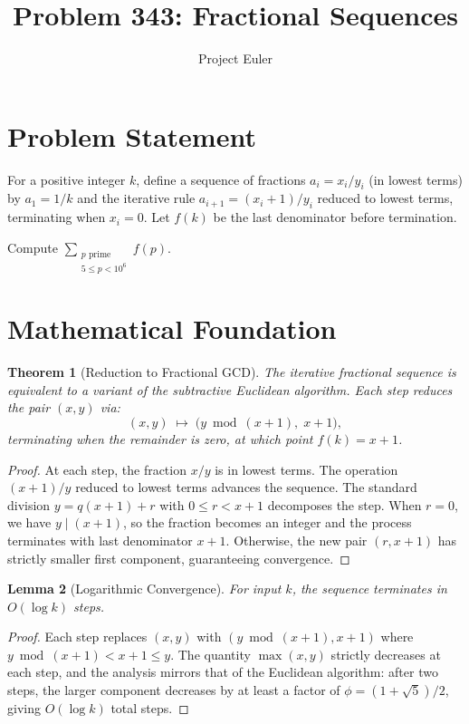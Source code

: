 \documentclass[a4paper,12pt]{article}
\title{Problem 343: Fractional Sequences}
\author{Project Euler}
\date{}
\newtheorem{theorem}{Theorem}
\newtheorem{lemma}[theorem]{Lemma}
\begin{document}
\maketitle

\section{Problem Statement}
For a positive integer $k$, define a sequence of fractions $a_i = x_i/y_i$ (in lowest terms) by $a_1 = 1/k$ and the iterative rule $a_{i+1} = (x_i + 1)/y_i$ reduced to lowest terms, terminating when $x_i = 0$. Let $f(k)$ be the last denominator before termination.

Compute $\displaystyle\sum_{\substack{p \text{ prime} \\ 5 \le p < 10^6}} f(p)$.

\section{Mathematical Foundation}

\begin{theorem}[Reduction to Fractional GCD]
The iterative fractional sequence is equivalent to a variant of the subtractive Euclidean algorithm. Each step reduces the pair $(x, y)$ via:
\[
(x, y) \;\longmapsto\; \bigl(y \bmod (x+1),\; x+1\bigr),
\]
terminating when the remainder is zero, at which point $f(k) = x + 1$.
\end{theorem}

\begin{proof}
At each step, the fraction $x/y$ is in lowest terms. The operation $(x+1)/y$ reduced to lowest terms advances the sequence. The standard division $y = q(x+1) + r$ with $0 \le r < x+1$ decomposes the step. When $r = 0$, we have $y \mid (x+1)$, so the fraction becomes an integer and the process terminates with last denominator $x+1$. Otherwise, the new pair $(r, x+1)$ has strictly smaller first component, guaranteeing convergence.
\end{proof}

\begin{lemma}[Logarithmic Convergence]
For input $k$, the sequence terminates in $O(\log k)$ steps.
\end{lemma}

\begin{proof}
Each step replaces $(x, y)$ with $(y \bmod (x+1), x+1)$ where $y \bmod (x+1) < x+1 \le y$. The quantity $\max(x,y)$ strictly decreases at each step, and the analysis mirrors that of the Euclidean algorithm: after two steps, the larger component decreases by at least a factor of $\phi = (1+\sqrt{5})/2$, giving $O(\log k)$ total steps.
\end{proof}
\end{document}

